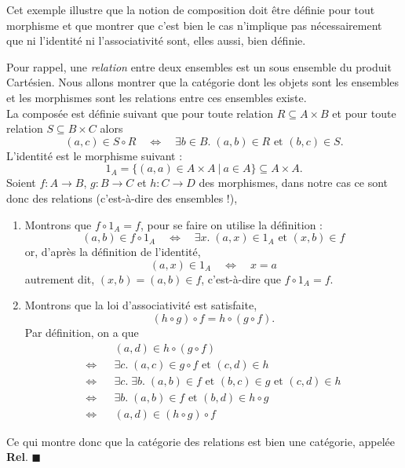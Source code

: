 \documentclass{article}
\begin{document}
Cet exemple illustre que la notion de composition doit être définie pour tout morphisme et que montrer que c'est bien le cas n'implique pas nécessairement que ni l'identité ni l'associativité sont, elles aussi, bien définie.

\begin{example}[Rel]{}
    Pour rappel, une \textit{relation} entre deux ensembles est un sous ensemble du produit Cartésien. Nous allons montrer que la catégorie dont les objets sont les ensembles et les morphismes sont les relations entre ces ensembles existe.\\

    \noindent
    La composée est définie suivant que pour toute relation $R\subseteq A\times B$ et pour toute relation $S\subseteq B\times C$ alors
        $$
        (a, c)\in S\circ R\quad\Leftrightarrow\quad\exists b\in B.\; (a, b)\in R\text{ et }(b, c)\in S.
        $$
    L'identité est le morphisme suivant :
        $$
        1_A=\{(a, a)\in A\times A\ |\ a\in A\}\subseteq A\times A.
        $$
    Soient $f:A\to B$, $g:B\to C$ et $h:C\to D$ des morphismes, dans notre cas ce sont donc des relations (c'est-à-dire des ensembles !),
    \begin{enumerate}
        \item Montrons que $f\circ1_A=f$, pour se faire on utilise la définition :
        $$
        (a, b)\in f\circ1_A\quad\Leftrightarrow\quad\exists x.\; (a, x)\in1_A\text{ et }(x, b)\in f
        $$
        or, d'après la définition de l'identité,
        $$
        (a, x)\in1_A\quad\Leftrightarrow\quad x=a
        $$
        autrement dit, $(x, b)=(a, b)\in f$, c'est-à-dire que $f\circ1_A=f$.
        \item Montrons que la loi d'associativité est satisfaite,
        $$
        (h\circ g)\circ f=h\circ(g\circ f).
        $$
        Par définition, on a que
        \begin{equation*}
        \begin{aligned}
                        && (a, d)\in h\circ(g\circ f)\\
        \Leftrightarrow && \exists c.\;(a, c)\in g\circ f\text{ et }(c, d)\in h\\
        \Leftrightarrow && \exists c.\;\exists b.\;(a,b)\in f\text{ et }(b, c)\in g\text{ et }(c, d)\in h\\
        \Leftrightarrow && \exists b.\;(a, b)\in f\text{ et }(b, d)\in h\circ g\\
        \Leftrightarrow && (a, d)\in(h\circ g)\circ f
        \end{aligned}
        \end{equation*}
    \end{enumerate}
    \noindent
    Ce qui montre donc que la catégorie des relations est bien une catégorie, appelée \textbf{Rel}. $\blacksquare$
\end{example}
\end{document}
